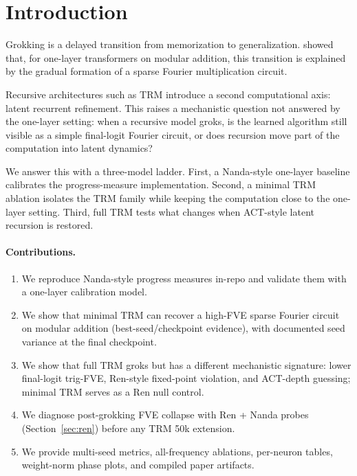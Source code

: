 \section{Introduction}

Grokking is a delayed transition from memorization to generalization.
\citet{nanda2023progress} showed that, for one-layer transformers on modular addition, this transition is explained by the gradual formation of a sparse Fourier multiplication circuit.

Recursive architectures such as TRM introduce a second computational axis: latent recurrent refinement.
This raises a mechanistic question not answered by the one-layer setting: when a recursive model groks, is the learned algorithm still visible as a simple final-logit Fourier circuit, or does recursion move part of the computation into latent dynamics?

We answer this with a three-model ladder.
First, a Nanda-style one-layer baseline calibrates the progress-measure implementation.
Second, a minimal TRM ablation isolates the TRM family while keeping the computation close to the one-layer setting.
Third, full TRM tests what changes when ACT-style latent recursion is restored.

\paragraph{Contributions.}
\begin{enumerate}
  \item We reproduce Nanda-style progress measures in-repo and validate them with a one-layer calibration model.
  \item We show that minimal TRM can recover a high-FVE sparse Fourier circuit on modular addition (best-seed/checkpoint evidence), with documented seed variance at the final checkpoint.
  \item We show that full TRM groks but has a different mechanistic signature: lower final-logit trig-FVE, Ren-style fixed-point violation, and ACT-depth guessing; minimal TRM serves as a Ren null control.
  \item We diagnose post-grokking FVE collapse with Ren + Nanda probes (Section~\ref{sec:ren}) before any TRM 50k extension.
  \item We provide multi-seed metrics, all-frequency ablations, per-neuron tables, weight-norm phase plots, and compiled paper artifacts.
\end{enumerate}
